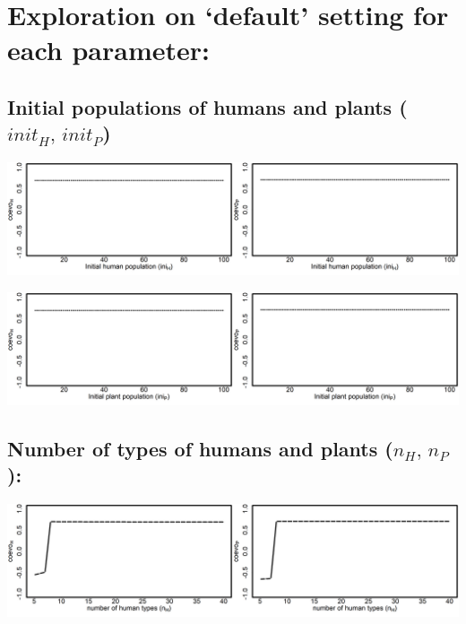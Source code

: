 \documentclass[]{book}
\begin{document}
\newpage

\hypertarget{exploration-on-default-setting-for-each-parameter}{%
\section{Exploration on `default' setting for each parameter:}\label{exploration-on-default-setting-for-each-parameter}}

\hypertarget{initial-populations-of-humans-and-plants-init_hinit_p}{%
\subsection{\texorpdfstring{Initial populations of humans and plants (\(init_{H},\,init_{P}\))}{Initial populations of humans and plants (init\_\{H\},\textbackslash{},init\_\{P\})}}\label{initial-populations-of-humans-and-plants-init_hinit_p}}

\includegraphics[width=1\linewidth]{plots/2_onePar-init.H_bifplot-pair}

\includegraphics[width=1\linewidth]{plots/2_onePar-init.P_bifplot-pair}

\hypertarget{number-of-types-of-humans-and-plants-n_hn_p}{%
\subsection{\texorpdfstring{Number of types of humans and plants (\(n_{H},\,n_{P}\)):}{Number of types of humans and plants (n\_\{H\},\textbackslash{},n\_\{P\}):}}\label{number-of-types-of-humans-and-plants-n_hn_p}}

\includegraphics[width=1\linewidth]{plots/2_onePar-n.H_bifplot-pair}
\end{document}
